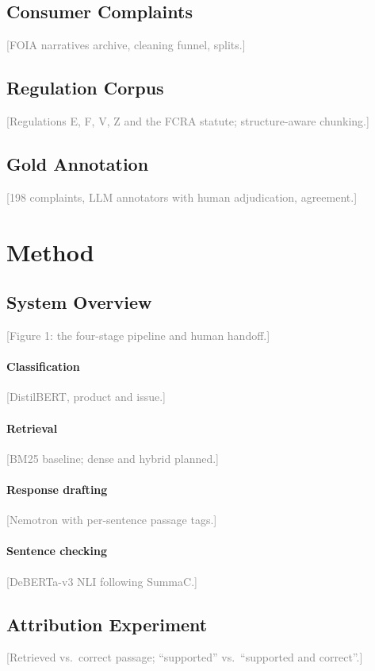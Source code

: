 \documentclass[10pt]{article}
\newcommand{\todo}[1]{\textcolor{gray}{[#1]}}
\begin{document}
\subsection{Consumer Complaints}
\todo{FOIA narratives archive, cleaning funnel, splits.}

\subsection{Regulation Corpus}
\todo{Regulations E, F, V, Z and the FCRA statute; structure-aware chunking.}

\subsection{Gold Annotation}
\todo{198 complaints, LLM annotators with human adjudication, agreement.}

\section{Method}

\subsection{System Overview}
\todo{Figure 1: the four-stage pipeline and human handoff.}

\paragraph{Classification}
\todo{DistilBERT, product and issue.}

\paragraph{Retrieval}
\todo{BM25 baseline; dense and hybrid planned.}

\paragraph{Response drafting}
\todo{Nemotron with per-sentence passage tags.}

\paragraph{Sentence checking}
\todo{DeBERTa-v3 NLI following SummaC.}

\subsection{Attribution Experiment}
\todo{Retrieved vs.\ correct passage; ``supported'' vs.\ ``supported and correct''.}
\end{document}
